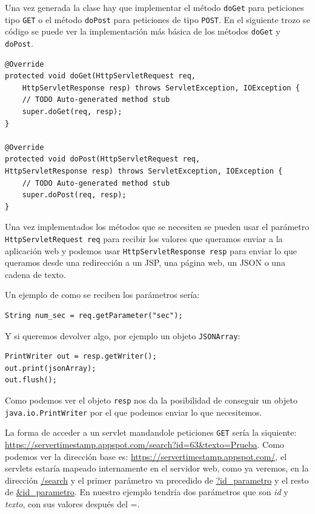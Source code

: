 Una vez generada la clase hay que implementar el método \lstinline{doGet} para peticiones tipo \lstinline{GET} o el método \lstinline{doPost} para peticiones de tipo \lstinline{POST}. En el siguiente trozo se código se puede ver la implementación más básica de los métodos \lstinline{doGet} y \lstinline{doPost}.

\begin{lstlisting}[style=Java] 
@Override
protected void doGet(HttpServletRequest req, 
	HttpServletResponse resp) throws ServletException, IOException {
	// TODO Auto-generated method stub
	super.doGet(req, resp);
}

@Override
protected void doPost(HttpServletRequest req, 
HttpServletResponse resp) throws ServletException, IOException {
	// TODO Auto-generated method stub
	super.doPost(req, resp);
}
\end{lstlisting}

Una vez implementados los métodos que se necesiten se pueden usar el parámetro \lstinline{HttpServletRequest req} para recibir los valores que queramos enviar a la aplicación web y podemos usar \lstinline{HttpServletResponse resp} para enviar lo que queramos desde una redirección a un JSP, una página web, un JSON o una cadena de texto. 

Un ejemplo de como se reciben los parámetros sería: 

\begin{lstlisting}[style=Java]  
String num_sec = req.getParameter("sec");
\end{lstlisting}

Y si queremos devolver algo, por ejemplo un objeto \lstinline{JSONArray}:

\begin{lstlisting}[style=Java]   
PrintWriter out = resp.getWriter();
out.print(jsonArray);
out.flush();
\end{lstlisting}

Como podemos ver el objeto \lstinline{resp} nos da la posibilidad de conseguir un objeto \lstinline{java.io.PrintWriter} por el que podemos enviar lo que necesitemos.

La forma de acceder a un servlet mandandole peticiones \lstinline{GET} sería la siquiente: \url{https://servertimestamp.appspot.com/search?id=63&texto=Prueba}. Como podemos ver la dirección base es: \url{https://servertimestamp.appspot.com/}, el servlets estaría mapeado internamente en el servidor web, como ya veremos, en la dirección \url{/search} y el primer parámetro va precedido de \url{?id\_parametro} y el resto de \url{\&id\_parametro}. En nuestro ejemplo tendría dos parámetros que son \textit{id} y \textit{texto}, con sus valores después del =.

